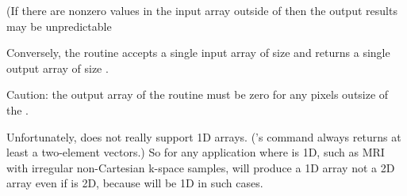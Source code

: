 (If there are nonzero values in the input array
outside of 
then the output results may be unpredictable

Conversely,
the  routine
accepts a single input array
of size 
and returns a single output array
of size .

Caution:
the output array of the  routine
must be zero for any pixels
outsize of the .

Unfortunately,
\matlab does not really support 1D arrays.
(\matlab's  command always returns 
at least a two-element vectors.)
So for any application where
 is 1D,
such as MRI with irregular non-Cartesian k-space samples,
will produce a 1D array
not a 2D array
even if  is 2D,
because  will be 1D in such cases.


